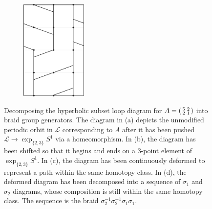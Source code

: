 \documentclass[12pt,twoside]{reedthesis}
\theoremstyle{definition}
\newcommand{\LS}{\mathcal{L}}
\newcommand{\exptwothree}{\exp_{\{2,3\}}}
\begin{document}
\begin{figure}[p]
\begin{subfigure}[t]{0.24\linewidth}
    \caption{}
  \end{subfigure}
  \hfill
  \begin{subfigure}[t]{0.24\linewidth}
    \centering
    \includegraphics[height=5cm]{figures/subset_loop_ppqq_decomposed.pdf}
    \caption{}
  \end{subfigure}
  \caption{Decomposing the hyperbolic subset loop diagram for $A = 
  \protect\begin{psmallmatrix}5 & 2 \\ 2 & 1\protect\end{psmallmatrix}$ into braid group generators. The diagram in (a) depicts the unmodified periodic orbit in $\LS$ corresponding to $A$ after it has been pushed $\LS \to \exptwothree S^1$ via a homeomorphism. In (b), the diagram has been shifted so that it begins and ends on a 3-point element of $\exptwothree S^1$. In (c), the diagram has been continuously deformed to represent a path within the same homotopy class. In (d), the deformed diagram has been decomposed into a sequence of $\sigma_1$ and $\sigma_2$ diagrams, whose composition is still within the same homotopy class. The sequence is the braid $\sigma_2^{-1} \sigma_2^{-1} \sigma_1 \sigma _1$.} 
  \label{fig:subset_loop_decompositions_1}
\end{figure}
\end{document}
